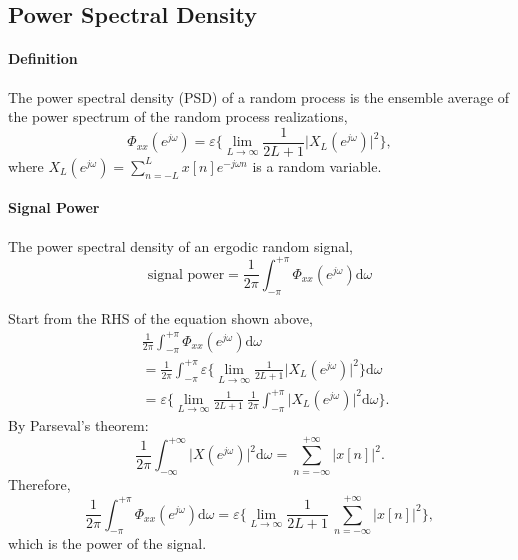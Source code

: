\subsection{Power Spectral Density}
\paragraph{Definition} The power spectral density (PSD) of a random process is the ensemble average of the power spectrum of the random process realizations,
\[
    \Phi_{xx} (e^{j\omega}) = \varepsilon \bigg\{ \lim_{L\to\infty} \frac{1}{2L+1} \lvert X_{L}(e^{j\omega}) \rvert^2 \bigg\},
\]
where $X_{L}(e^{j\omega}) = \sum_{n=-L}^{L} x[n] e^{-j\omega n}$ is a random variable.

\paragraph{Signal Power} The power spectral density of an ergodic random signal,
\[ 
    \text{signal power} = \frac{1}{2\pi} \int_{-\pi}^{+\pi} \Phi_{xx}(e^{j\omega}) \mathrm{d}\omega
\]
\begin{dv}{}
Start from the RHS of the equation shown above,
\begin{align*}
    & \frac{1}{2\pi} \int_{-\pi}^{+\pi} \Phi_{xx}(e^{j\omega}) \mathrm{d}\omega \\
    & = \frac{1}{2\pi} \int_{-\pi}^{+\pi} \varepsilon \bigg\{ \lim_{L\to \infty} \frac{1} {2L+1} \lvert X_L (e^{j\omega}) \rvert^2 \bigg \} \mathrm{d}\omega \\
    & = \varepsilon \bigg\{ \lim_{L\to \infty} \frac{1} {2L+1} \ \frac{1}{2\pi} \int_{-\pi}^{+\pi} \lvert X_L (e^{j\omega}) \rvert^2 \mathrm{d}\omega \bigg\}.
\end{align*}
By Parseval's theorem:
\[
    \frac{1}{2\pi} \int_{-\infty}^{+\infty} \lvert X(e^{j\omega}) \rvert^2 \mathrm{d}\omega = \sum_{n=-\infty}^{+\infty} \lvert x[n] \rvert^2.
\]
Therefore, 
\[
    \frac{1}{2\pi} \int_{-\pi}^{+\pi} \Phi_{xx}(e^{j\omega}) \mathrm{d}\omega = \varepsilon \bigg\{ \lim_{L\to \infty} \frac{1} {2L+1} \ \sum_{n=-\infty}^{+\infty} \lvert x[n] \rvert^2 \bigg\},
\]
which is the power of the signal.
\end{dv}

